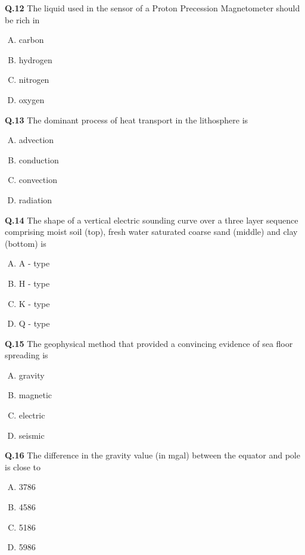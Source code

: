 \textbf{Q.12} The liquid used in the sensor of a Proton Precession Magnetometer should be rich in
\begin{multicols}{4}
    


\begin{enumerate}[(A)]
\item carbon \item  hydrogen \item  nitrogen \item  oxygen
\end{enumerate}
\end{multicols}

\textbf{Q.13} The dominant process of heat transport in the lithosphere is
\begin{multicols}{4}
    
\begin{enumerate}[(A)]
\item advection \item  conduction \item  convection \item  radiation
\end{enumerate}
\end{multicols}

\textbf{Q.14} The shape of a vertical electric sounding curve over a three layer sequence comprising moist soil (top), fresh water saturated coarse sand (middle) and clay (bottom) is
\begin{multicols}{4}
\begin{enumerate}[(A)]
\item A - type \item  H - type \item  K - type \item  Q - type
\end{enumerate}
\end{multicols}


\textbf{Q.15} The geophysical method that provided a convincing evidence of sea floor spreading is
\begin{multicols}{4}
\begin{enumerate}[(A)]
\item gravity \item  magnetic \item  electric \item  seismic
\end{enumerate}
\end{multicols}

\textbf{Q.16} The difference in the gravity value (in mgal) between the equator and pole is close to
\begin{multicols}{4}
\begin{enumerate}[(A)]
\item 3786 \item  4586 \item  5186 \item  5986
\end{enumerate}
\end{multicols}

